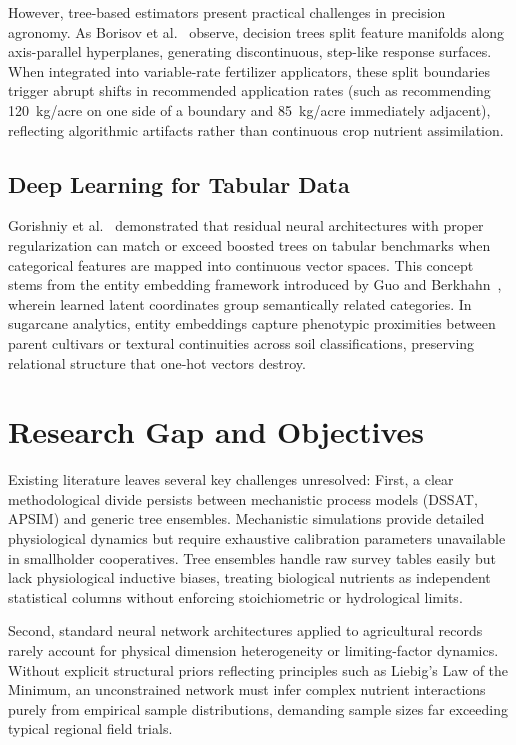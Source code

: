 \documentclass[conference,10pt,letterpaper]{IEEEtran}
\begin{document}
However, tree-based estimators present practical challenges in precision agronomy. As Borisov et al.~\cite{borisov2022deep} observe, decision trees split feature manifolds along axis-parallel hyperplanes, generating discontinuous, step-like response surfaces. When integrated into variable-rate fertilizer applicators, these split boundaries trigger abrupt shifts in recommended application rates (such as recommending 120~kg/acre on one side of a boundary and 85~kg/acre immediately adjacent), reflecting algorithmic artifacts rather than continuous crop nutrient assimilation.

\subsection{Deep Learning for Tabular Data}
Gorishniy et al.~\cite{gorishniy2021revisiting} demonstrated that residual neural architectures with proper regularization can match or exceed boosted trees on tabular benchmarks when categorical features are mapped into continuous vector spaces. This concept stems from the entity embedding framework introduced by Guo and Berkhahn~\cite{guo2016entity}, wherein learned latent coordinates group semantically related categories. In sugarcane analytics, entity embeddings capture phenotypic proximities between parent cultivars or textural continuities across soil classifications, preserving relational structure that one-hot vectors destroy.

\section{Research Gap and Objectives}

Existing literature leaves several key challenges unresolved:
First, a clear methodological divide persists between mechanistic process models (DSSAT, APSIM) and generic tree ensembles. Mechanistic simulations provide detailed physiological dynamics but require exhaustive calibration parameters unavailable in smallholder cooperatives. Tree ensembles handle raw survey tables easily but lack physiological inductive biases, treating biological nutrients as independent statistical columns without enforcing stoichiometric or hydrological limits.

Second, standard neural network architectures applied to agricultural records rarely account for physical dimension heterogeneity or limiting-factor dynamics. Without explicit structural priors reflecting principles such as Liebig's Law of the Minimum, an unconstrained network must infer complex nutrient interactions purely from empirical sample distributions, demanding sample sizes far exceeding typical regional field trials.
\end{document}
